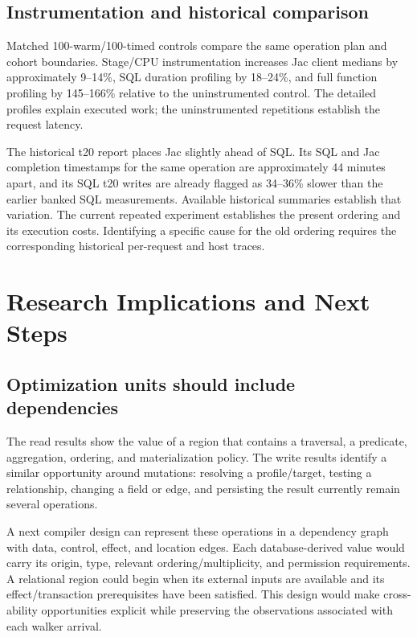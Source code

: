 \documentclass[sigconf,nonacm]{acmart}
\begin{document}
\subsection{Instrumentation and historical comparison}
Matched 100-warm/100-timed controls compare the same operation plan and cohort
boundaries. Stage/CPU instrumentation increases Jac client medians by
approximately 9--14\%, SQL duration profiling by 18--24\%, and full function
profiling by 145--166\% relative to the uninstrumented control. The detailed
profiles explain executed work; the uninstrumented repetitions establish
the request latency.

The historical t20 report places Jac slightly ahead of SQL. Its SQL and Jac
completion timestamps for the same operation are approximately 44 minutes
apart, and its SQL t20 writes are already flagged as 34--36\% slower than the
earlier banked SQL measurements. Available historical summaries establish
that variation. The current repeated experiment establishes the present
ordering and its execution costs. Identifying a specific cause for the old
ordering requires the corresponding historical per-request and host traces.

\section{Research Implications and Next Steps}
\label{sec:discussion}

\subsection{Optimization units should include dependencies}
The read results show the value of a region that contains a traversal, a
predicate, aggregation, ordering, and materialization policy. The write
results identify a similar opportunity around mutations: resolving a
profile/target, testing a relationship, changing a field or edge, and
persisting the result currently remain several operations.

A next compiler design can represent these operations in a dependency graph
with data, control, effect, and location edges. Each database-derived value
would carry its origin, type, relevant ordering/multiplicity, and permission
requirements. A relational region could begin when its external inputs are
available and its effect/transaction prerequisites have been satisfied. This
design would make cross-ability opportunities explicit while preserving the
observations associated with each walker arrival.
\end{document}
